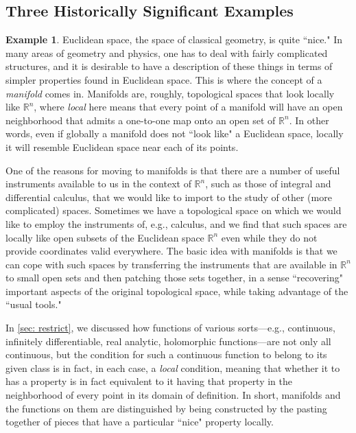 \documentclass[11pt]{book}
\theoremstyle{definition}
\newtheorem{example}{Example}[section]
\theoremstyle{definition}
\theoremstyle{definition}
\theoremstyle{theorem}
\theoremstyle{definition}
\begin{document}
\subsection{Three Historically Significant Examples}
\begin{example}\label{example: manifold}
	Euclidean space, the space of classical geometry, is quite ``nice." In many areas of geometry and physics, one has to deal with fairly complicated structures, and it is desirable to have a description of these things in terms of simpler properties found in Euclidean space. This is where the concept of a \textit{manifold} comes in. Manifolds are, roughly, topological spaces that look locally like $\mathbb{R}^n$, where \textit{local} here means that every point of a manifold will have an open neighborhood that admits a one-to-one map onto an open set of $\mathbb{R}^n$. In other words, even if globally a manifold does not ``look like" a Euclidean space, locally it will resemble Euclidean space near each of its points.  \par 
	One of the reasons for moving to manifolds is that there are a number of useful instruments available to us in the context of $\mathbb{R}^n$, such as those of integral and differential calculus, that we would like to import to the study of other (more complicated) spaces. Sometimes we have a topological space on which we would like to employ the instruments of, e.g., calculus, and we find that such spaces are locally like open subsets of the Euclidean space $\mathbb{R}^n$ even while they do not provide coordinates valid everywhere. The basic idea with manifolds is that we can cope with such spaces by transferring the instruments that are available in $\mathbb{R}^n$ to small open sets and then patching those sets together, in a sense ``recovering" important aspects of the original topological space, while taking advantage of the ``usual tools." \par 
	In \ref{sec: restrict}, we discussed how functions of various sorts---e.g., continuous, infinitely differentiable, real analytic, holomorphic functions---are not only all continuous, but the condition for such a continuous function to belong to its given class is in fact, in each case, a \textit{local} condition, meaning that whether it to has a property is in fact equivalent to it having that property in the neighborhood of every point in its domain of definition. In short, manifolds and the functions on them are distinguished by being constructed by the pasting together of pieces that have a particular ``nice" property locally. \par 

\end{example}
\end{document}
